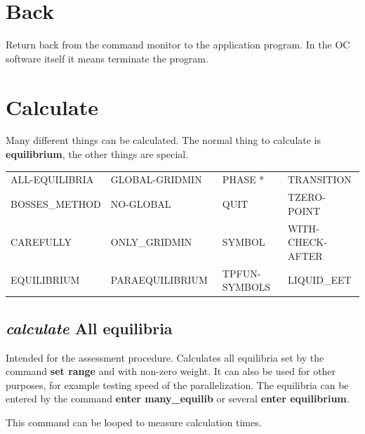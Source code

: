 \documentclass[11pt]{article}
\begin{document}

\hypertarget{Back}{}
\section{Back }

Return back from the command monitor to the application program.  In
the OC software itself it means terminate the program.

\hypertarget{Calculate}{}
\section{Calculate }

Many different things can be calculated.  The normal thing to calculate is
{\bf equilibrium}, the other things are special.

{\small
\begin{tabular}{llll}
 ALL-EQUILIBRIA~ & GLOBAL-GRIDMIN~ & PHASE *      & TRANSITION      \\
 BOSSES\_METHOD  & NO-GLOBAL~      & QUIT         & TZERO-POINT \\
 CAREFULLY       & ONLY\_GRIDMIN   & SYMBOL       & WITH-CHECK-AFTER\\
 EQUILIBRIUM     & PARAEQUILIBRIUM~ & TPFUN-SYMBOLS~ & LIQUID\_EET \\
\end{tabular}
}

\hypertarget{Calculate all}{}
\subsection{{\em calculate} All equilibria}\label{sc:calcall}

Intended for the assessment procedure.  Calculates all equilibria set
by the command {\bf set range} and with non-zero weight.  It can also
be used for other purposes, for example testing speed of the
parallelization.  The equilibria can be entered by the command {\bf
  enter many\_equilib} or several {\bf enter equilibrium}.

This command can be looped to measure calculation times.

\hypertarget{Calculate Bosses-method}{}
\hypertarget{Calculate carefully}{}
\end{document}
